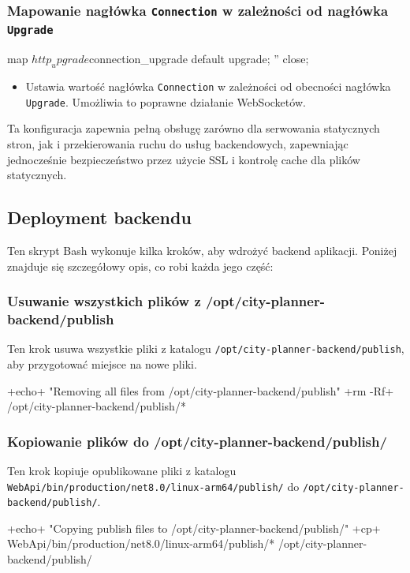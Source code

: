 \subsubsection{Mapowanie nagłówka \texttt{Connection} w zależności od nagłówka \texttt{Upgrade}}
\begin{longlisting}[language=nginx,label={lst:n11}]
map $http_upgrade $connection_upgrade {
  default upgrade;
  ''      close;
}
\end{longlisting}
\begin{itemize}
    \item Ustawia wartość nagłówka \texttt{Connection} w zależności od obecności nagłówka \texttt{Upgrade}.
    Umożliwia to poprawne działanie WebSocketów.
\end{itemize}

Ta konfiguracja zapewnia pełną obsługę zarówno dla serwowania statycznych stron, jak i przekierowania ruchu do usług backendowych, zapewniając jednocześnie bezpieczeństwo przez użycie SSL i kontrolę cache dla plików statycznych.

\subsection{Deployment backendu}
\label{subsec:deployment-backendu}
Ten skrypt Bash wykonuje kilka kroków, aby wdrożyć backend aplikacji.
Poniżej znajduje się szczegółowy opis, co robi każda jego część:

\subsubsection{Usuwanie wszystkich plików z /opt/city-planner-backend/publish}
Ten krok usuwa wszystkie pliki z katalogu \texttt{/opt/city-planner-backend/publish}, aby przygotować miejsce na nowe pliki.
\begin{longlisting}[style=shell-colored,label={lst:db1}]
+echo+ "Removing all files from /opt/city-planner-backend/publish"
+rm -Rf+ /opt/city-planner-backend/publish/*
\end{longlisting}

\subsubsection{Kopiowanie plików do /opt/city-planner-backend/publish/}
Ten krok kopiuje opublikowane pliki z katalogu \texttt{WebApi/bin/production/net8.0/linux-arm64/publish/} do \texttt{/opt/city-planner-backend/publish/}.
\begin{longlisting}[style=shell-colored,label={lst:db2}]
+echo+ "Copying publish files to /opt/city-planner-backend/publish/"
+cp+ WebApi/bin/production/net8.0/linux-arm64/publish/* /opt/city-planner-backend/publish/
\end{longlisting}

